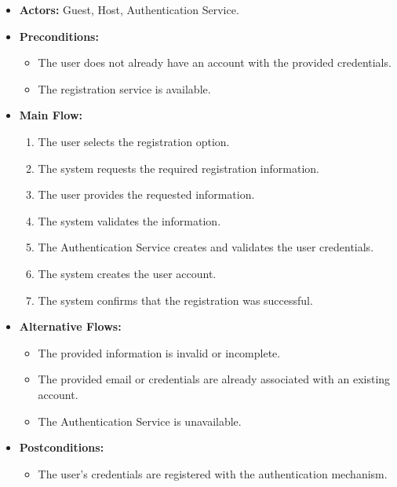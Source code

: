 \begin{itemize}
    \item \textbf{Actors:} Guest, Host, Authentication Service.
    
    \item \textbf{Preconditions:}
    \begin{itemize}
        \item The user does not already have an account with the provided credentials.
        \item The registration service is available.
    \end{itemize}
    
    \item \textbf{Main Flow:}
    \begin{enumerate}
        \item The user selects the registration option.
        \item The system requests the required registration information.
        \item The user provides the requested information.
        \item The system validates the information.
        \item The Authentication Service creates and validates the user credentials.
        \item The system creates the user account.
        \item The system confirms that the registration was successful.
    \end{enumerate}
    
    \item \textbf{Alternative Flows:}
    \begin{itemize}
        \item The provided information is invalid or incomplete.
        \item The provided email or credentials are already associated with an existing account.
        \item The Authentication Service is unavailable.
    \end{itemize}
    
    \item \textbf{Postconditions:}
    \begin{itemize}
        \item The user's credentials are registered with the authentication mechanism.
    \end{itemize}
\end{itemize}


